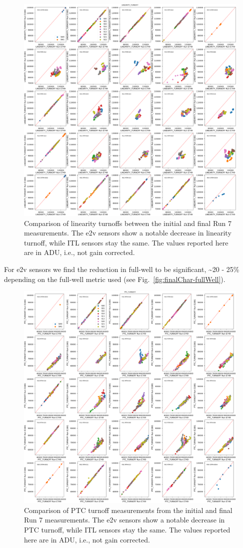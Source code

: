 \begin{figure}[ht]
    \centering
    \includegraphics[width=0.7\linewidth]{figures/finalCharacterization/E749_E1881_LINEARITY_TURNOFF.png}
    \caption{Comparison of linearity turnoffs between the initial and final Run 7 measurements. The e2v sensors show a notable decrease in linearity turnoff, while ITL sensors stay the same. The values reported here are in ADU, i.e., not gain corrected.}
    \label{fig:finalChar-Linearity-5x5}
\end{figure}

For e2v sensors we find the reduction in full-well to be significant, \textasciitilde20 - 25\% depending on the full-well metric used (see Fig.~\ref{fig:finalChar-fullWell}). 

\begin{figure}[ht]
    \centering
    \includegraphics[width=0.7\linewidth]{figures/finalCharacterization/E749_E1881_PTC_TURNOFF.png}
    \caption{Comparison of PTC turnoff measurements from the initial and final Run 7 measurements. The e2v sensors show a notable decrease in PTC turnoff, while ITL sensors stay the same. The values reported here are in ADU, i.e., not gain corrected.}
    \label{fig:finalChar-PTCTurnoff-5x5}
\end{figure}


